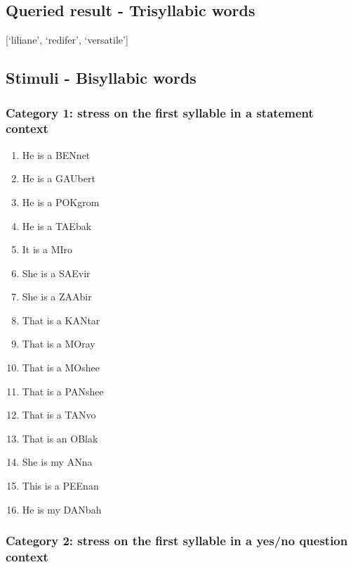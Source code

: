 \documentclass[a4paper]{article}
\begin{document}
\subsection{Queried result - Trisyllabic words}
\label{appendix:b}
[`liliane', `redifer', ‘versatile']

\subsection{Stimuli - Bisyllabic words}
\label{testitems}

\subsubsection{Category 1: stress on the first syllable in a statement context}

\begin{enumerate}
\item He is a BENnet
\item He is a GAUbert
\item He is a POKgrom
\item He is a TAEbak
\item It is a MIro
\item She is a SAEvir
\item She is a ZAAbir
\item That is a KANtar
\item That is a MOray
\item That is a MOshee
\item That is a PANshee
\item That is a TANvo
\item That is an OBlak
\item She is my ANna
\item This is a PEEnan
\item He is my DANbah
\end{enumerate}

\subsubsection{Category 2: stress on the first syllable in a yes/no question context}
\end{document}
